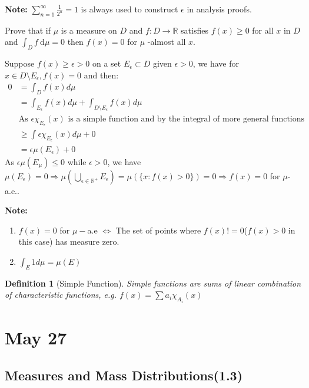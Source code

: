 \documentclass[12pt, a4paper]{article}
\newtheorem{definition}{Definition}[subsection]
\begin{document}
\textbf{Note: }$\displaystyle \sum_{n=1}^{\infty} \frac{1}{2^n} = 1$ is always used to construct $\epsilon$ in analysis proofs.
 
\begin{customexercise}{1.24}
    Prove that if $\mu$ is a measure on $D$ and $f: D \rightarrow \mathbb{R}$ satisfies $f(x) \geq 0$ for all $x$ in $D$ and $\int_{D} f \mathrm{~d} \mu=0$ then $f(x)=0$ for $\mu$ -almost all $x$.
\end{customexercise}

\begin{customsol}{1.24}
Suppose $f(x)\geq\epsilon>0$ on a set $E_\epsilon\subset D$ given $\epsilon>0$, we have for $x\in D\setminus E_\epsilon, f(x)=0$ and then:
$$\begin{aligned}
    0 &= \int_D f(x) d\mu\\ &= \int_{E_\epsilon} f(x)d\mu + \int_{D\setminus E_\epsilon} f(x)d\mu\\
    &\text{As }\epsilon \chi_{E_\epsilon}(x) \text{ is a simple function and by the integral of more general functions}\\
    &\geq \int \epsilon \chi_{E_\epsilon}(x) d\mu + 0 \\ &= \epsilon\mu(E_\epsilon) + 0
\end{aligned}$$
As $\epsilon\mu(E_\mu)\leq 0$ while $\epsilon>0$, we have $\mu(E_\epsilon) = 0 \Rightarrow \mu\left(\bigcup_{\epsilon\in\mathbb{R}^+} E_\epsilon\right) = \mu\left(\{x: f(x)>0\}\right) = 0\Rightarrow f(x) = 0$ for $\mu$-a.e.. 
\end{customsol}

\textbf{Note: } 
\begin{enumerate}
    \item $f(x) = 0$ for $\mu-$a.e $\Leftrightarrow$ The set of points where $f(x)!=0$($f(x)>0$ in this case) has measure zero.
    \item $\displaystyle\int_E 1 d\mu = \mu(E)$
\end{enumerate}
\begin{definition}[Simple Function]
    Simple functions are sums of linear combination of characteristic functions, e.g. $\displaystyle f(x) = \sum a_i \chi_{A_i}(x)$
\end{definition}

\newpage
\section{May 27}
\subsection{Measures and Mass Distributions(1.3)}
\end{document}
